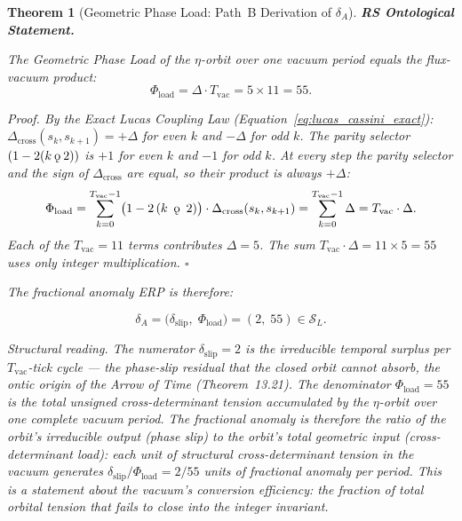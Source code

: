 \documentclass[11pt, letterpaper]{article}
\newcommand{\Dcross}{\Delta_{\mathrm{cross}}}
\newcommand{\koppa}{\mathbin{\text{\rm\k{o}}}}
\theoremstyle{definition}
\theoremstyle{plain}
\newtheorem{theorem}{Theorem}[section]
\begin{document}
\begin{theorem}[Geometric Phase Load: Path~B Derivation of $\delta_A$]

\textbf{RS Ontological Statement.}

The Geometric Phase Load of the $\eta$-orbit over one vacuum period equals the
flux-vacuum product:
\begin{equation}
    \Phi_\mathrm{load} = \Delta \cdot T_\mathrm{vac} = 5 \times 11 = 55.
    \label{eq:phiload_55}
\end{equation}

\textit{Proof.} By the Exact Lucas Coupling Law
(Equation~\eqref{eq:lucas_cassini_exact}):
$\Dcross(s_k, s_{k+1}) = +\Delta$ for even $k$ and $-\Delta$ for odd $k$.
The parity selector $(1 - 2(k \koppa 2))$ is $+1$ for even $k$ and $-1$ for odd $k$.
At every step the parity selector and the sign of $\Dcross$ are equal, so their
product is always $+\Delta$:
\[
    \Phi_\mathrm{load}
    = \sum_{k=0}^{T_\mathrm{vac}-1}
      \bigl(1 - 2\,(k\;\koppa\;2)\bigr) \cdot \Dcross(s_k, s_{k+1})
    = \sum_{k=0}^{T_\mathrm{vac}-1} \Delta
    = T_\mathrm{vac} \cdot \Delta.
\]
Each of the $T_\mathrm{vac} = 11$ terms contributes $\Delta = 5$.
The sum $T_\mathrm{vac} \cdot \Delta = 11 \times 5 = 55$ uses only integer
multiplication. $\square$

The fractional anomaly ERP is therefore:

\begin{equation}
    \boxed{\delta_A = \bigl(\delta_\mathrm{slip},\; \Phi_\mathrm{load}\bigr)
                    = (2,\; 55) \in \mathcal{S}_L.}
    \label{eq:pathB}
\end{equation}

\textit{Structural reading.} The numerator $\delta_\mathrm{slip} = 2$ is the
irreducible temporal surplus per $T_\mathrm{vac}$-tick cycle — the phase-slip
residual that the closed orbit cannot absorb, the ontic origin of the Arrow of Time
(Theorem~13.21). The denominator $\Phi_\mathrm{load} = 55$ is the total unsigned
cross-determinant tension accumulated by the $\eta$-orbit over one complete vacuum
period. The fractional anomaly is therefore the ratio of the orbit's irreducible
output (phase slip) to the orbit's total geometric input (cross-determinant load):
each unit of structural cross-determinant tension in the vacuum generates
$\delta_\mathrm{slip}/\Phi_\mathrm{load} = 2/55$ units of fractional anomaly per
period. This is a statement about the vacuum's \emph{conversion efficiency}: the
fraction of total orbital tension that fails to close into the integer invariant.
\end{theorem}
\end{document}
